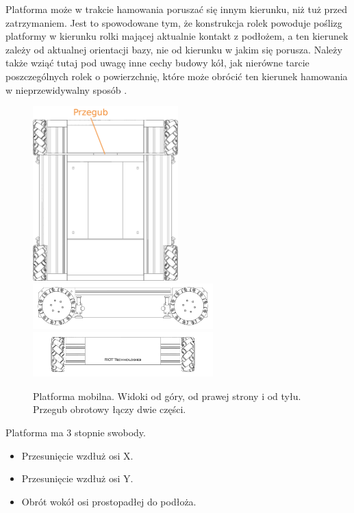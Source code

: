 	Platforma może w trakcie hamowania poruszać się innym kierunku, niż tuż przed zatrzymaniem.
	Jest to spowodowane tym, że konstrukcja rolek powoduje poślizg platformy w kierunku rolki mającej aktualnie kontakt z podłożem, a ten kierunek zależy od aktualnej
	orientacji bazy, nie od kierunku w jakim się porusza.
	Należy także wziąć tutaj pod uwagę inne cechy budowy kół, jak nierówne tarcie poszczególnych rolek o powierzchnię, 
	które może obrócić ten kierunek hamowania w nieprzewidywalny sposób \cite{braking}.

	\begin{figure}[H]
	\centering
	\includegraphics[width=0.5\textwidth]{graphics/base_top.png}
	\includegraphics[width=0.62\textwidth]{graphics/base_side.pdf}
	\includegraphics[width=0.62\textwidth]{graphics/base_front.pdf}
	\caption{Platforma mobilna. Widoki od góry, od prawej strony i od tyłu. Przegub obrotowy łączy dwie części.}
	\label{fig:base_ortho}
	\end{figure} 

	Platforma ma 3 stopnie swobody. 
	\begin{itemize}
		\item Przesunięcie wzdłuż osi X.
		\item Przesunięcie wzdłuż osi Y.
		\item Obrót wokół osi prostopadłej do podłoża.
	\end{itemize}
	
